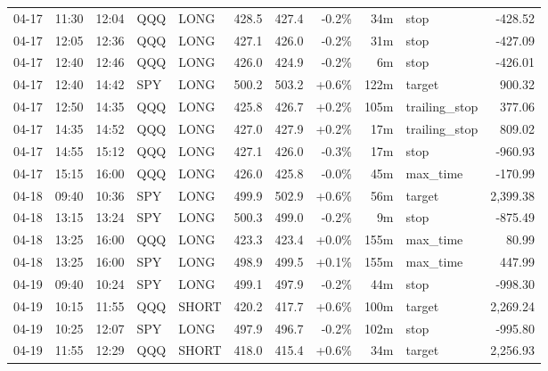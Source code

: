 \documentclass[11pt,a4paper,twoside]{article}
\begin{document}
\begin{center}
\begin{longtable}{>{\color{txtmain}}l l l l l r r r r >{\color{txtmain}}l r}
04-17 & 11:30 & 12:04 & QQQ & LONG & 428.5 & 427.4 & \textcolor{lossred}{-0.2\%} & 34m & stop & \textcolor{lossred}{-428.52} \\
04-17 & 12:05 & 12:36 & QQQ & LONG & 427.1 & 426.0 & \textcolor{lossred}{-0.2\%} & 31m & stop & \textcolor{lossred}{-427.09} \\
04-17 & 12:40 & 12:46 & QQQ & LONG & 426.0 & 424.9 & \textcolor{lossred}{-0.2\%} & 6m & stop & \textcolor{lossred}{-426.01} \\
04-17 & 12:40 & 14:42 & SPY & LONG & 500.2 & 503.2 & \textcolor{wingreen}{+0.6\%} & 122m & target & \textcolor{wingreen}{900.32} \\
04-17 & 12:50 & 14:35 & QQQ & LONG & 425.8 & 426.7 & \textcolor{wingreen}{+0.2\%} & 105m & trailing\_stop & \textcolor{wingreen}{377.06} \\
04-17 & 14:35 & 14:52 & QQQ & LONG & 427.0 & 427.9 & \textcolor{wingreen}{+0.2\%} & 17m & trailing\_stop & \textcolor{wingreen}{809.02} \\
04-17 & 14:55 & 15:12 & QQQ & LONG & 427.1 & 426.0 & \textcolor{lossred}{-0.3\%} & 17m & stop & \textcolor{lossred}{-960.93} \\
04-17 & 15:15 & 16:00 & QQQ & LONG & 426.0 & 425.8 & \textcolor{lossred}{-0.0\%} & 45m & max\_time & \textcolor{lossred}{-170.99} \\
04-18 & 09:40 & 10:36 & SPY & LONG & 499.9 & 502.9 & \textcolor{wingreen}{+0.6\%} & 56m & target & \textcolor{wingreen}{2,399.38} \\
04-18 & 13:15 & 13:24 & SPY & LONG & 500.3 & 499.0 & \textcolor{lossred}{-0.2\%} & 9m & stop & \textcolor{lossred}{-875.49} \\
04-18 & 13:25 & 16:00 & QQQ & LONG & 423.3 & 423.4 & \textcolor{wingreen}{+0.0\%} & 155m & max\_time & \textcolor{wingreen}{80.99} \\
04-18 & 13:25 & 16:00 & SPY & LONG & 498.9 & 499.5 & \textcolor{wingreen}{+0.1\%} & 155m & max\_time & \textcolor{wingreen}{447.99} \\
04-19 & 09:40 & 10:24 & SPY & LONG & 499.1 & 497.9 & \textcolor{lossred}{-0.2\%} & 44m & stop & \textcolor{lossred}{-998.30} \\
04-19 & 10:15 & 11:55 & QQQ & SHORT & 420.2 & 417.7 & \textcolor{wingreen}{+0.6\%} & 100m & target & \textcolor{wingreen}{2,269.24} \\
04-19 & 10:25 & 12:07 & SPY & LONG & 497.9 & 496.7 & \textcolor{lossred}{-0.2\%} & 102m & stop & \textcolor{lossred}{-995.80} \\
04-19 & 11:55 & 12:29 & QQQ & SHORT & 418.0 & 415.4 & \textcolor{wingreen}{+0.6\%} & 34m & target & \textcolor{wingreen}{2,256.93} \\

\end{longtable}
\end{center}
\end{document}
